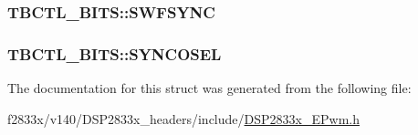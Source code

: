 \subsubsection[{S\+W\+F\+S\+Y\+N\+C}]{ T\+B\+C\+T\+L\+\_\+\+B\+I\+T\+S\+::\+S\+W\+F\+S\+Y\+N\+C}\label{struct_t_b_c_t_l___b_i_t_s_a1d2212fc310d325ea8640851029b87f3}
\hypertarget{struct_t_b_c_t_l___b_i_t_s_afa440d6bae07f57ad2f2661d47a1d7ab}{}
\subsubsection[{S\+Y\+N\+C\+O\+S\+E\+L}]{ T\+B\+C\+T\+L\+\_\+\+B\+I\+T\+S\+::\+S\+Y\+N\+C\+O\+S\+E\+L}\label{struct_t_b_c_t_l___b_i_t_s_afa440d6bae07f57ad2f2661d47a1d7ab}


The documentation for this struct was generated from the following file\+:\begin{DoxyCompactItemize}
\item 
f2833x/v140/\+D\+S\+P2833x\+\_\+headers/include/\hyperlink{_d_s_p2833x___e_pwm_8h}{D\+S\+P2833x\+\_\+\+E\+Pwm.\+h}\end{DoxyCompactItemize}
